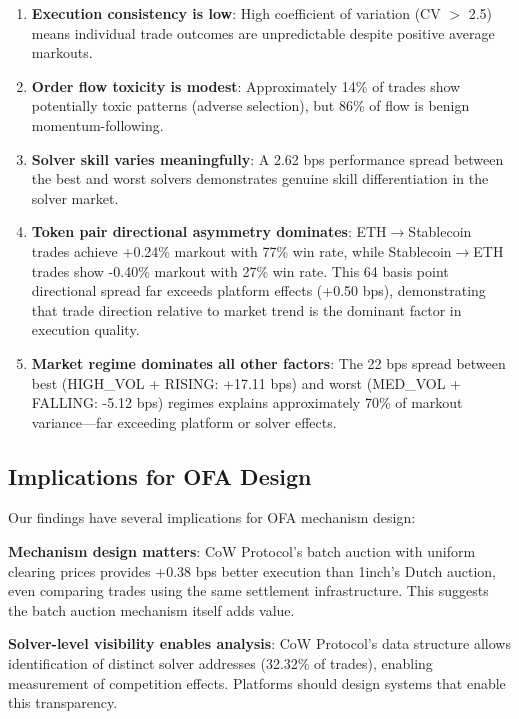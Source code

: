 \documentclass[12pt,a4paper]{article}
\begin{document}
\begin{enumerate}[leftmargin=*]
    \item \textbf{Execution consistency is low}: High coefficient of variation (CV $>$ 2.5) means individual trade outcomes are unpredictable despite positive average markouts.

    \item \textbf{Order flow toxicity is modest}: Approximately 14\% of trades show potentially toxic patterns (adverse selection), but 86\% of flow is benign momentum-following.

    \item \textbf{Solver skill varies meaningfully}: A 2.62 bps performance spread between the best and worst solvers demonstrates genuine skill differentiation in the solver market.

    \item \textbf{Token pair directional asymmetry dominates}: ETH$\rightarrow$Stablecoin trades achieve +0.24\% markout with 77\% win rate, while Stablecoin$\rightarrow$ETH trades show -0.40\% markout with 27\% win rate. This 64 basis point directional spread far exceeds platform effects (+0.50 bps), demonstrating that trade direction relative to market trend is the dominant factor in execution quality.

    \item \textbf{Market regime dominates all other factors}: The 22 bps spread between best (HIGH\_VOL + RISING: +17.11 bps) and worst (MED\_VOL + FALLING: -5.12 bps) regimes explains approximately 70\% of markout variance---far exceeding platform or solver effects.
\end{enumerate}

\subsection{Implications for OFA Design}

Our findings have several implications for OFA mechanism design:

\textbf{Mechanism design matters}: CoW Protocol's batch auction with uniform clearing prices provides +0.38 bps better execution than 1inch's Dutch auction, even comparing trades using the same settlement infrastructure. This suggests the batch auction mechanism itself adds value.

\textbf{Solver-level visibility enables analysis}: CoW Protocol's data structure allows identification of distinct solver addresses (32.32\% of trades), enabling measurement of competition effects. Platforms should design systems that enable this transparency.
\end{document}
